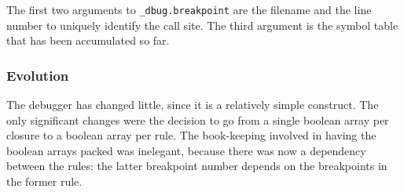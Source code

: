 The first two arguments to \verb|_dbug.breakpoint| are the filename and the line number to uniquely identify the call site.
The third argument is the symbol table that has been accumulated so far.

\subsubsection{Evolution}
The debugger has changed little, since it is a relatively simple construct.
The only significant changes were the decision to go from a single boolean array per closure to a boolean array per rule.
The book-keeping involved in having the boolean arrays packed was inelegant, because there was now a dependency between the rules: the latter breakpoint number depends on the breakpoints in the former rule.

